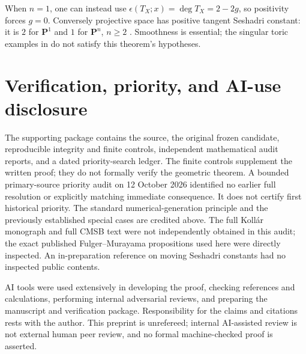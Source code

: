 \documentclass[11pt]{article}
\newcommand{\PP}{\mathbf P}
\begin{document}
When $n=1$, one can instead use
$\epsilon(T_X;x)=\deg T_X=2-2g$, so positivity forces $g=0$.
Conversely projective space has positive tangent Seshadri constant:
it is $2$ for $\PP^1$ and $1$ for $\PP^n$, $n\geq2$
\cite[Example 4.2]{FM}. Smoothness is essential; the singular toric
examples in \cite[Example 0.4]{Chang} do not satisfy this theorem's
hypotheses.

\section*{Verification, priority, and AI-use disclosure}

The supporting package contains the source, the original frozen candidate,
reproducible integrity and finite controls, independent mathematical audit
reports, and a dated priority-search ledger. The finite controls supplement
the written proof; they do not formally verify the geometric theorem.
A bounded primary-source priority audit on 12 October 2026 identified no
earlier full resolution or explicitly matching immediate consequence. It
does not certify first historical priority. The standard numerical-generation
principle and the previously established special cases are credited above.
The full Koll\'ar monograph and full CMSB text were not independently obtained
in this audit; the exact published Fulger--Murayama propositions used here
were directly inspected. An in-preparation reference on moving Seshadri
constants had no inspected public contents.

AI tools were used extensively in developing the proof, checking references
and calculations, performing internal adversarial reviews, and preparing the
manuscript and verification package. Responsibility for the claims and
citations rests with the author. This preprint is unrefereed; internal
AI-assisted review is not external human peer review, and no formal
machine-checked proof is asserted.
\end{document}
